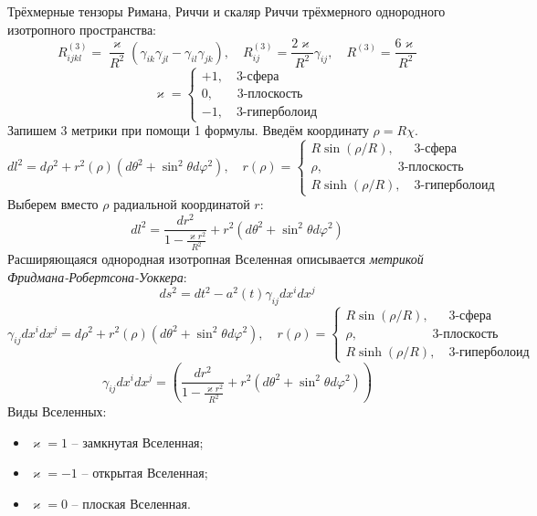 \documentclass[12pt]{article}
\theoremstyle{definition}
\begin{document}
Трёхмерные тензоры Римана, Риччи и скаляр Риччи трёхмерного однородного изотропного пространства:
\begin{equation}
    R^{(3)}_{ijkl}=\frac{\varkappa}{R^2}(\gamma_{ik}\gamma_{jl}-\gamma_{il}\gamma_{jk}),\quad R^{(3)}_{ij}=\frac{2\varkappa}{R^2}\gamma_{ij},\quad R^{(3)}=\frac{6\varkappa}{R^2}
\end{equation}
\begin{equation}
    \varkappa=\begin{cases}
        +1,\quad\text{3-сфера}\\            0,\quad\;\;\;\text{3-плоскость}\\
        -1,\quad\text{3-гиперболоид}
    \end{cases}
\end{equation}
Запишем 3 метрики при помощи 1 формулы. Введём координату $\rho=R\chi$.
\begin{equation}
    dl^2=d\rho^2+r^2(\rho)(d\theta^2+\sin^2\theta d\varphi^2),\quad r(\rho)=
    \begin{cases}
        R\sin(\rho/R),\quad\;\;\text{3-сфера}\\
        \rho,\quad\quad\quad\quad\quad\;\;\;\text{3-плоскость}\\
        R\sinh(\rho/R),\quad\text{3-гиперболоид}
    \end{cases}
\end{equation}
    Выберем вместо $\rho$ радиальной координатой $r$:
    \begin{equation}
        dl^2=\frac{dr^2}{1-\frac{\varkappa r^2}{R^2}}+r^2(d\theta^2+\sin^2\theta d\varphi^2)
    \end{equation}
    Расширяющаяся однородная изотропная Вселенная описывается \textit{метрикой Фридмана-Робертсона-Уоккера}:
    \begin{equation}
        \boxed{ds^2=dt^2-a^2(t)\gamma_{ij}dx^idx^j}
    \end{equation}
    \begin{equation}
        \gamma_{ij}dx^idx^j=d\rho^2+r^2(\rho)(d\theta^2+\sin^2\theta d\varphi^2),\quad r(\rho)=\begin{cases}
            R\sin(\rho/R),\quad\;\;\text{3-сфера}\\
            \rho,\quad\quad\quad\quad\quad\;\;\;\text{3-плоскость}\\
            R\sinh(\rho/R),\quad\text{3-гиперболоид}
        \end{cases}
    \end{equation}
    \begin{equation}
        \gamma_{ij}dx^idx^j=\left(\frac{dr^2}{1-\frac{\varkappa r^2}{R^2}}+r^2(d\theta^2+\sin^2\theta d\varphi^2)\right)
    \end{equation}
    Виды Вселенных:
    \begin{itemize}
        \item $\varkappa=1$ -- замкнутая Вселенная;
        \item $\varkappa=-1$ -- открытая Вселенная;
        \item $\varkappa=0$ -- плоская Вселенная.
    \end{itemize}
\end{document}

